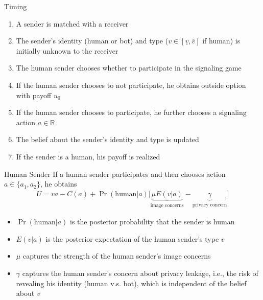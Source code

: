 \documentclass[11pt,aspectratio=169]{beamer}
\DeclareMathOperator{\prob}{Pr}
\begin{document}
\begin{frame}{Timing}

\begin{enumerate}\setlength{\itemsep}{1em}
    \item A sender is matched with a receiver
    \item The sender's identity (human or bot) and type ($v\in [\underline{v},\overline{v}]$ if human) is initially unknown to the receiver
    \item The human sender chooses whether to participate in the signaling game
    \item If the human sender chooses to not participate, he obtains outside option with payoff $u_0$
    \item If the human sender chooses to participate, he further chooses a signaling action $a\in \mathbb{R}$
    \item The belief about the sender's identity and type is updated
    \item If the sender is a human, his payoff is realized
\end{enumerate}
    
\end{frame}


\begin{frame}{Human Sender}
If a human sender participates and then chooses action $a\in \{a_1,a_2\}$, he obtains
\begin{align*}
    U = va - C(a) + \prob(\text{human}|a)\Big[\underbrace{\mu E(v|a)}_{\text{image concerns}} - \underbrace{\gamma}_{{\text{privacy concern}}}\Big]
\end{align*}
\vspace{1em}

\begin{itemize}
    \item $\prob(\text{human}|a)$ is the posterior probability that the sender is human
    \item $E(v|a)$ is the posterior expectation of the human sender's type $v$ 
    \item $\mu$ captures the strength of the human sender's image concerns
    \item $\gamma$ captures the human sender's concern about privacy leakage, i.e., the risk of revealing his identity (human v.s. bot), which is independent of the belief about $v$
\end{itemize}
\end{frame}
\end{document}
